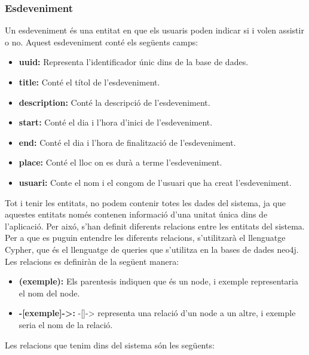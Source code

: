\documentclass[11pt,catalan,listoffigures,listoftables]{tfgetsinf}
\begin{document}
\subsubsection{Esdeveniment}
Un esdeveniment és una entitat en que els usuaris poden indicar si i volen assistir o no. Aquest esdeveniment conté els següents camps:
\begin{itemize}
	\item \textbf{uuid:} Representa l'identificador únic dins de la base de dades.
	\item \textbf{title:} Conté el títol de l'esdeveniment.
	\item \textbf{description:} Conté la descripció de l'esdeveniment.
	\item \textbf{start:} Conté el dia i l'hora d'inici de l'esdeveniment.
	\item \textbf{end:} Conté el dia i l'hora de finalització de l'esdeveniment.
	\item \textbf{place:} Conté el lloc on es durà a terme l'esdeveniment.
	\item \textbf{usuari:} Conte el nom i el congom de l'usuari que ha creat l'esdeveniment.
\end{itemize}
Tot i tenir les entitats, no podem contenir totes les dades del sistema, ja que aquestes entitats només contenen informació d'una unitat única dins de l'aplicació. Per aixó, s'han definit diferents relacions entre les entitats del sistema. Per a que es puguin entendre les diferents relacions, s'utilitzarà el llenguatge Cypher, que és el llenguatge de queries que s'utilitza en la bases de dades neo4j. Les relacions es definiràn de la següent manera:
\begin{itemize}
	\item \textbf{(exemple):} Els parentesis indiquen que és un node, i exemple representaria el nom del node.
	\item \textbf{-[exemple]->:} -[]-> representa una relació d'un node a un altre, i exemple seria el nom de la relació.
\end{itemize}
Les relacions que tenim dins del sistema són les següents:
\end{document}
